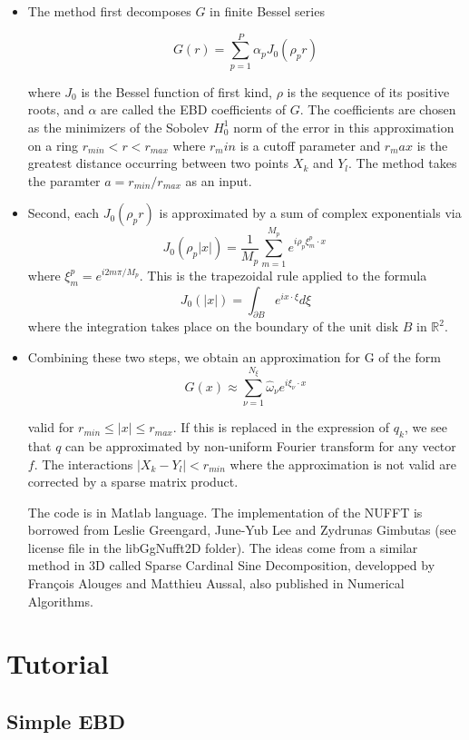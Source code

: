 \documentclass[]{article}
\begin{document}
\begin{itemize}
	\item The method first decomposes $G$ in finite Bessel series
	
	$$G(r) = \sum_{p = 1}^P \alpha_p J_0(\rho_p r) $$
	
	where $J_0$ is the Bessel function of first kind, $\rho$ is the sequence of its positive roots, and $\alpha$ are called the EBD coefficients of $G$. The coefficients are chosen as the minimizers of the Sobolev $H^1_0$ norm of the error in this approximation on a ring $r_{min} < r < r_{max}$ where $r_min$ is a cutoff parameter and $r_max$ is the greatest distance occurring between two points $X_k$ and $Y_l$. The method takes the paramter $a = r_{min}/r_{max}$ as an input.
\item Second, each $J_0(\rho_p r)$ is approximated by a sum of complex exponentials via
$$J_0(\rho_p |x|) = \frac{1}{M_p}\sum_{m = 1}^{M_p} e^{i \rho_p \xi_{m}^p \cdot x}\,$$
where $\xi^p_m = e^{i 2m \pi/M_p}$. This is the trapezoidal rule applied to the formula
$$J_0(|x|) = \int_{\partial B} e^{i x \cdot \xi} d\xi$$
where the integration takes place on the boundary of the unit disk $B$ in $\mathbb{R}^2$.
\item Combining these two steps, we obtain an approximation for G of the form 
$$G(x) \approx \sum_{\nu = 1}^{N_\xi} \hat{\omega}_\nu e^{i \xi_\nu \cdot x}$$

valid for $r_{min} \leq |x|\leq r_{max}$. If this is replaced in the expression of $q_k$, we see that $q$ can be approximated by non-uniform Fourier transform for any vector $f$. The interactions $|X_k - Y_l| < r_{min}$  where the approximation is not valid are corrected by a sparse matrix product.

The code is in Matlab language. The implementation of the NUFFT is borrowed from Leslie Greengard, June-Yub Lee and Zydrunas Gimbutas (see license file in the libGgNufft2D folder). The ideas come from a similar method in 3D called Sparse Cardinal Sine Decomposition, developped by François Alouges and Matthieu Aussal, also published in Numerical Algorithms.

\end{itemize}

\section{Tutorial}

\subsection{Simple EBD}
\end{document}
